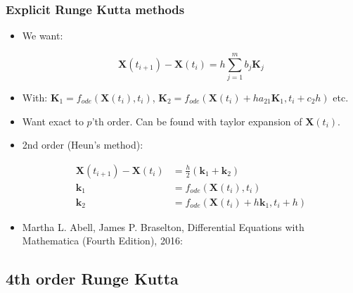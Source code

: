\documentclass{beamer}
\begin{document}
\begin{frame}
\frametitle{Explicit Runge Kutta methods}
\begin{itemize}

\item<1-> We want:

\begin{equation*}
\mathbf{X}(t_{i+1})-\mathbf{X}(t_{i}) =  h \sum_{j=1}^{m} b_j \mathbf{K}_j
\end{equation*}

\item<1-> With: $\mathbf{K}_1 =  f_{ode}(\mathbf{X}(t_i),t_i)$, $\mathbf{K}_2 =  f_{ode}(\mathbf{X}(t_i)+ha_{21}\mathbf{K}_{1},t_i+c_2h)$ etc.

\item<2-> Want exact to $p$'th order. Can be found with taylor expansion of $\mathbf{X}(t_{i})$.

\item<3-> 2nd order (Heun's method):

\begin{align*}
\mathbf{X}(t_{i+1})-\mathbf{X}(t_{i}) &= \frac{h}{2}(\mathbf{k}_1+\mathbf{k}_2)\\
\mathbf{k}_1 &= f_{ode}(\mathbf{X}(t_i),t_i)\\
\mathbf{k}_2 &= f_{ode}(\mathbf{X}(t_i)+h\mathbf{k}_1,t_i+h)
\end{align*}

\item<1-> {{\color{gray} Martha L. Abell, James P. Braselton, Differential Equations with Mathematica (Fourth Edition), 2016}}:
\end{itemize}
\end{frame}


\subsection{4th order Runge Kutta}
\end{document}
